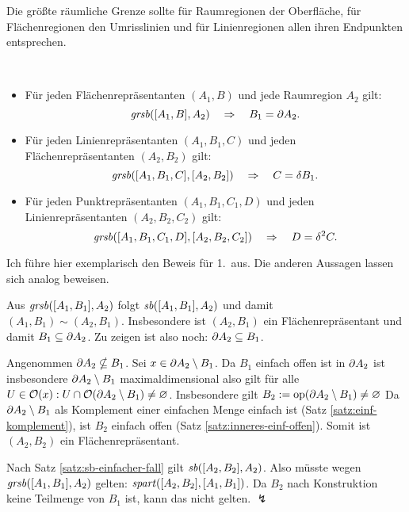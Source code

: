     Die größte räumliche Grenze sollte für Raumregionen der Oberfläche, für Flächenregionen den Umrisslinien und für Linienregionen allen ihren Endpunkten entsprechen.
    \begin{satz}[$\Ggrsb$]\ \vspace{0pt} 

        \begin{itemize}
            \item Für jeden Flächenrepräsentanten $(A_1,B)$ und jede Raumregion $A_2$ gilt:
                $$\mathit{gr\hspace*{-0.25ex}sb}([A_1,B],A_2) \quad \Rightarrow \quad B_1 = \partial A_2.$$
            \item Für jeden Linienrepräsentanten $(A_1,B_1,C)$ und jeden Flächenrepräsentanten $(A_2,B_2)$ gilt:
                $$\mathit{gr\hspace*{-0.25ex}sb}([A_1,B_1,C],[A_2,B_2]) \quad \Rightarrow \quad C = \delta B_1.$$
            \item Für jeden Punktrepräsentanten $(A_1,B_1,C_1,D)$ und jeden Linienrepräsentanten $(A_2,B_2,C_2)$ gilt:
                $$\mathit{gr\hspace*{-0.25ex}sb}([A_1,B_1,C_1,D],[A_2,B_2,C_2]) \quad \Rightarrow \quad D = \delta^2 C.$$
        \end{itemize}

    \end{satz}
    Ich führe hier exemplarisch den Beweis für 1.\ aus. 
    Die anderen Aussagen lassen sich analog beweisen.
    \begin{bew}
        Aus $\mathit{gr\hspace*{-0.25ex}sb}([A_1,B_1],A_2)$ folgt $\mathit{sb}([A_1,B_1],A_2)$ und damit\\
        $(A_1,B_1) \sim (A_2,B_1)$.
        Insbesondere ist $(A_2,B_1)$ ein Flächenrepräsentant und damit $B_1 \subseteq \partial A_2$.
        Zu zeigen ist also noch: $\partial A_2 \subseteq B_1$.

        Angenommen $\partial A_2 \nsubseteq B_1$.
        Sei $x \in \partial A_2 \setminus B_1$. 
        Da $B_1$ einfach offen ist in $\partial A_2$ ist insbesondere $\partial A_2 \setminus B_1$ maximaldimensional also gilt für alle $U \in \mathcal{O}(x): U \cap \mathcal{O}(\partial A_2 \setminus B_1) \neq \varnothing$.
        Insbesondere gilt $B_2 := \text{op}(\partial A_2 \setminus B_1) \neq \varnothing$
        Da $\partial A_2 \setminus B_1$ als Komplement einer einfachen Menge einfach ist (Satz \ref{satz:einf-komplement}), ist $B_2$ einfach offen (Satz \ref{satz:inneres-einf-offen}).
        Somit ist $(A_2,B_2)$ ein Flächenrepräsentant.

        Nach Satz \ref{satz:sb-einfacher-fall} gilt $\mathit{sb}([A_2,B_2],A_2)$.
        Also müsste wegen\\
        $\mathit{gr\hspace*{-0.25ex}sb}([A_1,B_1],A_2)$ gelten: $\mathit{spart}([A_2,B_2],[A_1,B_1])$.
        Da $B_2$ nach Konstruktion keine Teilmenge von $B_1$ ist, kann das nicht gelten. $\lightning$
    \end{bew}
